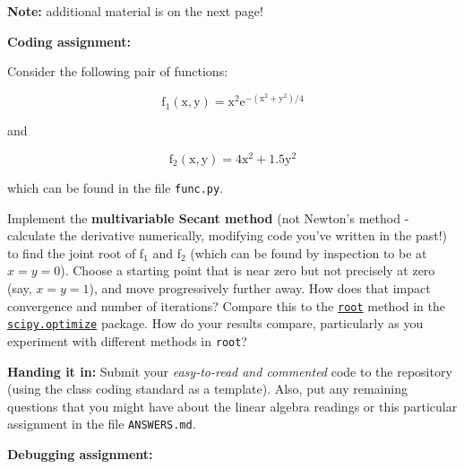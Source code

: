 \documentclass[10pt]{article}
\begin{document}
\vspace{5mm}


\textbf{Note:} additional material is on the next page!

\newpage

\noindent
\textbf{Coding assignment:}  
\vspace{3mm}

Consider the following pair of functions:

\begin{equation}
\mathrm{f_1(x,y) = x^2 e^{-(x^2+y^2)/4}}
\end{equation}

\noindent
and

\begin{equation}
\mathrm{f_2(x,y) = 4 x^2 + 1.5 y^2}
\end{equation}

\noindent 
which can be found in the file \texttt{func.py}.

Implement the \textbf{multivariable Secant method} (not Newton's
method - calculate the derivative numerically, modifying code you've
written in the past!) to find the joint root
of f$_1$ and f$_2$ (which can be found by inspection to be at
$x=y=0$).  Choose a starting point that is near zero but not precisely
at zero (say, $x=y=1$), and move progressively further away.  How does
that impact convergence and number of iterations?  Compare this to the
\href{https://docs.scipy.org/doc/scipy-0.18.1/reference/generated/scipy.optimize.root.html#scipy.optimize.root}{\texttt{root}}
method in the
\href{https://docs.scipy.org/doc/scipy-0.18.1/reference/optimize.html}{\texttt{scipy.optimize}}
package.  How do your results compare, particularly as you experiment
with different methods in \texttt{root}?

\vspace{2mm}

\noindent \textbf{Handing it in:} 
Submit your \textit{easy-to-read and commented} code to the
repository (using the class coding standard as a template).  Also, put any remaining questions that you might have
about the linear algebra readings or this particular assignment in
the file \texttt{ANSWERS.md}.

\vspace{5mm}

\noindent
\textbf{Debugging assignment:}  
\end{document}
